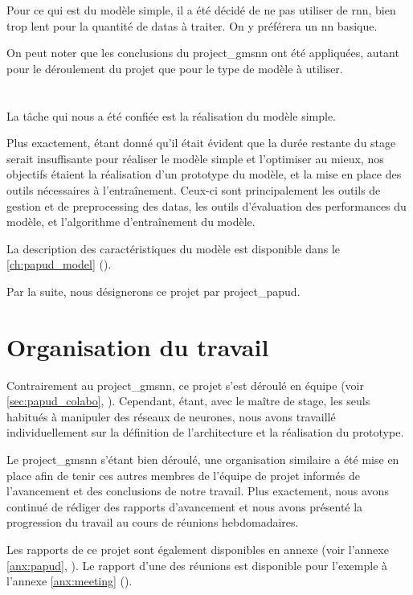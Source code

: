 Pour ce qui est du modèle simple, il a été décidé de ne pas utiliser de \gls{rnn}, bien trop lent pour la quantité de \glspl{data} à traiter. On y préférera un \gls{nn} basique.

On peut noter que les conclusions du \gls{project_gmsnn} ont été appliquées, autant pour le déroulement du projet que pour le type de modèle à utiliser.


\section{}
La tâche qui nous a été confiée est la réalisation du modèle simple.

Plus exactement, étant donné qu'il était évident que la durée restante du stage serait insuffisante pour réaliser le modèle simple et l'optimiser au mieux, nos objectifs étaient la réalisation d'un prototype du modèle, et la mise en place des outils nécessaires à l'entraînement.
Ceux-ci sont principalement les outils de gestion et de \gls{preprocessing} des \glspl{data}, les outils d'évaluation des performances du modèle, et l'algorithme d'entraînement du modèle.

La description des caractéristiques du modèle est disponible dans le \autoref{ch:papud_model} ().

Par la suite, nous désignerons ce projet par \og \gls{project_papud}\fg{}.

\section{Organisation du travail}
Contrairement au \gls{project_gmsnn}, ce projet s'est déroulé en équipe (voir \autoref{sec:papud_colabo}, ).
Cependant, étant, avec le maître de stage, les seuls habitués à manipuler des réseaux de neurones, nous avons travaillé individuellement sur la définition de l'architecture et la réalisation du prototype.

Le \gls{project_gmsnn} s'étant bien déroulé, une organisation similaire a été mise en place afin de tenir ces autres membres de l'équipe de projet informés de l'avancement et des conclusions de notre travail.
Plus exactement, nous avons continué de rédiger des rapports d'avancement et nous avons présenté la progression du travail au cours de réunions hebdomadaires.

Les rapports de ce projet sont également disponibles en annexe (voir l'annexe \ref{anx:papud}, ).
Le rapport d'une des réunions est disponible pour l'exemple à l'annexe \ref{anx:meeting} (). %

